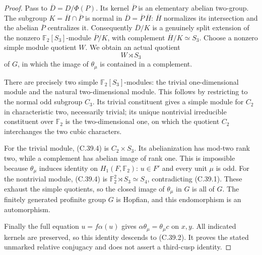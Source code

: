 \begin{proof}
Pass to \(\overline D=D/\Phi(P)\).
Its kernel \(\overline P\) is an elementary abelian
two-group. The subgroup
\(K=\overline H\cap\overline P\) is normal in
\(\overline D=\overline P\,\overline H\):
\(\overline H\) normalizes its intersection and the
abelian \(\overline P\) centralizes it.
Consequently \(\overline D/K\) is a genuinely split
extension of the nonzero \(\mathbb F_2[S_3]\)-module
\(\overline P/K\), with complement
\(\overline H/K\simeq S_3\). Choose a nonzero simple
module quotient \(W\). We obtain an actual quotient
\[
                                  W\rtimes S_3
 \tag{C.39.4}
\]
of \(G\), in which the image of \(\theta_\mu\) is
contained in a complement.

There are precisely two simple
\(\mathbb F_2[S_3]\)-modules: the trivial one-dimensional
module and the natural two-dimensional module. This
follows by restricting to the normal odd subgroup \(C_3\).
Its trivial constituent gives a simple module for \(C_2\)
in characteristic two, necessarily trivial; its unique
nontrivial irreducible constituent over \(\mathbb F_2\)
is the two-dimensional one, on which the quotient \(C_2\)
interchanges the two cubic characters.

For the trivial module, (C.39.4) is \(C_2\times S_3\).
Its abelianization has mod-two rank two, while a complement
has abelian image of rank one. This is impossible because
\(\theta_\mu\) induces identity on \(H_1(F,\mathbb F_2)\):
\(u\in F'\) and every unit \(\mu\) is odd.
For the nontrivial module, (C.39.4) is
\(\mathbb F_2^2\rtimes S_3\simeq S_4\), contradicting
(C.39.1). These exhaust the simple quotients, so the
closed image of \(\theta_\mu\) in \(G\) is all of \(G\).
The finitely generated profinite group \(G\) is Hopfian,
and this endomorphism is an automorphism.

Finally the full equation \(u=f\alpha(u)\) gives
\(\alpha\theta_\mu=\theta_\mu c\) on \(x,y\).
All indicated kernels are preserved, so this identity
descends to (C.39.2). It proves the stated unmarked
relative conjugacy and does not assert a third-cusp identity.
\end{proof}
